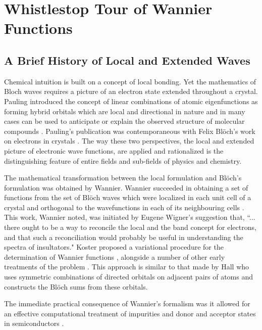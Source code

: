 \chapter{Whistlestop Tour of Wannier Functions}
\label{chap:wannier}
\section{A Brief History of Local and Extended Waves}
Chemical intuition is built on a concept of local bonding. 
Yet the mathematics of Bloch waves requires a picture of an 
electron state extended throughout a crystal.
Pauling introduced the concept of linear combinations of atomic eigenfunctions
as forming hybrid orbitals which are local and directional in nature and
in many cases can be used to anticipate or explain the observed structure
of molecular compounds \cite{pauling28}. Pauling's publication was contemporaneous
with Felix Bl\"och's work on electrons in crystals \cite{bloch28}. The
way these two perspectives, the local and extended picture of electronic wave functions, 
are applied and rationalized is the distinguishing feature 
of entire fields and sub-fields of physics and chemistry.

The mathematical transformation between the local formulation
and Bl\"och's formulation was obtained by Wannier. 
Wannier succeeded in obtaining a set of functions
from the set of Bl\"och waves which were localized in each unit cell
of a crystal and orthogonal to the wavefunctions in each of its
neighbouring cells \cite{wannier37, wannier62}. 
This work, Wannier noted, was initiated by Eugene Wigner's suggestion that, 
``... there ought to be a way to reconcile the local and the band concept 
for electrons, and that such a reconciliation would probably be useful in 
understanding the spectra of insultators." Koster proposed a variational
procedure for the determination of Wannier functions \cite{koster53},
alongside a number of other early treatments of the problem \cite{winston54}.
This approach is similar to that made by Hall \cite{hall52} who uses symmetric  
combinations of directed orbitals on adjacent pairs of atoms and constructs 
the Bl\"och sums from these orbitals.

The immediate practical consequence of Wannier's formalism was
it allowed for an effective computational treatment of impurities 
and donor and acceptor states in semiconductors \cite{slater49,kittel54}.

